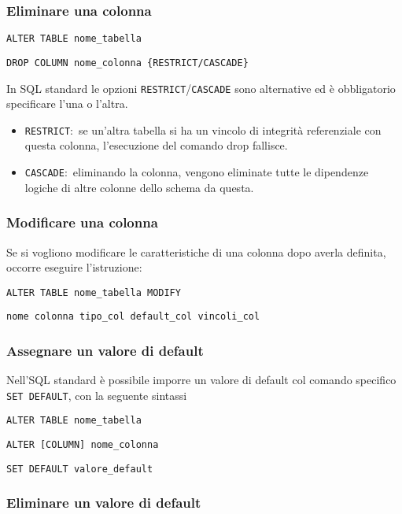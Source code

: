 \subsubsection{Eliminare una colonna}

\begin{flushleft}
	\texttt{ALTER TABLE nome\_tabella}

	\texttt{DROP COLUMN nome\_colonna \{RESTRICT/CASCADE\}}
\end{flushleft}

\noindent In SQL standard le opzioni \texttt{RESTRICT}/\texttt{CASCADE} sono alternative ed è obbligatorio specificare l'una o l'altra.
\begin{itemize}
	\item \texttt{RESTRICT}:\ se un'altra tabella si ha un vincolo di integrità referenziale con questa colonna, l'esecuzione del comando drop fallisce.
	\item \texttt{CASCADE}:\ eliminando la colonna, vengono eliminate tutte le dipendenze logiche di altre colonne dello schema da questa.
\end{itemize}

\subsubsection{Modificare una colonna}

Se si vogliono modificare le caratteristiche di una colonna dopo averla definita, occorre eseguire l'istruzione:
\begin{flushleft}
	\texttt{ALTER TABLE nome\_tabella MODIFY}

	\texttt{nome colonna tipo\_col default\_col vincoli\_col}
\end{flushleft}

\subsubsection{Assegnare un valore di default}
Nell'SQL standard è possibile imporre un valore di default col comando specifico \texttt{SET DEFAULT}, con la seguente sintassi
\begin{flushleft}
	\texttt{ALTER TABLE nome\_tabella}

	\texttt{ALTER [COLUMN] nome\_colonna}

	\texttt{SET DEFAULT valore\_default}
\end{flushleft}

\subsubsection{Eliminare un valore di default}

